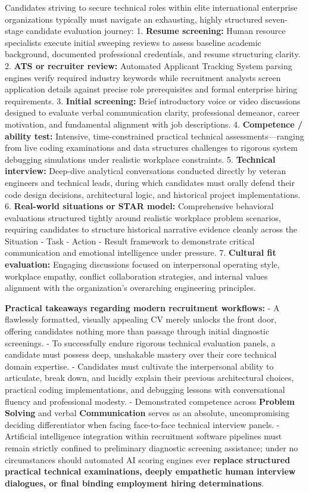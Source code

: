 Candidates striving to secure technical roles within elite international
enterprise organizations typically must navigate an exhausting, highly
structured seven-stage candidate evaluation journey: 1. \textbf{Resume
screening:} Human resource specialists execute initial sweeping reviews
to assess baseline academic background, documented professional
credentials, and resume structuring clarity. 2. \textbf{ATS or recruiter
review:} Automated Applicant Tracking System parsing engines verify
required industry keywords while recruitment analysts screen application
details against precise role prerequisites and formal enterprise hiring
requirements. 3. \textbf{Initial screening:} Brief introductory voice or
video discussions designed to evaluate verbal communication clarity,
professional demeanor, career motivation, and fundamental alignment with
job descriptions. 4. \textbf{Competence / ability test:} Intensive,
time-constrained practical technical assessments---ranging from live
coding examinations and data structures challenges to rigorous system
debugging simulations under realistic workplace constraints. 5.
\textbf{Technical interview:} Deep-dive analytical conversations
conducted directly by veteran engineers and technical leads, during
which candidates must orally defend their code design decisions,
architectural logic, and historical project implementations. 6.
\textbf{Real-world situations or STAR model:} Comprehensive behavioral
evaluations structured tightly around realistic workplace problem
scenarios, requiring candidates to structure historical narrative
evidence cleanly across the Situation - Task - Action - Result framework
to demonstrate critical communication and emotional intelligence under
pressure. 7. \textbf{Cultural fit evaluation:} Engaging discussions
focused on interpersonal operating style, workplace empathy, conflict
collaboration strategies, and internal values alignment with the
organization's overarching engineering principles.

\textbf{Practical takeaways regarding modern recruitment workflows:} - A
flawlessly formatted, visually appealing CV merely unlocks the front
door, offering candidates nothing more than passage through initial
diagnostic screenings. - To successfully endure rigorous technical
evaluation panels, a candidate must possess deep, unshakable mastery
over their core technical domain expertise. - Candidates must cultivate
the interpersonal ability to articulate, break down, and lucidly explain
their previous architectural choices, practical coding implementations,
and debugging lessons with conversational fluency and professional
modesty. - Demonstrated competence across \textbf{Problem Solving} and
verbal \textbf{Communication} serves as an absolute, uncompromising
deciding differentiator when facing face-to-face technical interview
panels. - Artificial intelligence integration within recruitment
software pipelines must remain strictly confined to preliminary
diagnostic screening assistance; under no circumstances should automated
AI scoring engines ever \textbf{replace structured practical technical
examinations, deeply empathetic human interview dialogues, or final
binding employment hiring determinations}.

